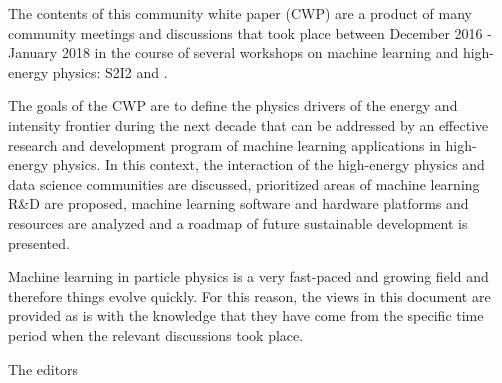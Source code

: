 The contents of this community white paper (CWP) are a product of many community meetings and discussions that took place between December 2016 - January 2018 in the course of several workshops on machine learning and high-energy physics: S2I2 and \cite{DSatHEP2017,IML2017,ACAT2017,HSF2017}.

The goals of the CWP are to define the physics drivers of the energy and intensity frontier during the next decade that can be addressed by an effective research and development program of machine learning applications in high-energy physics. In this context, the interaction of the high-energy physics and data science communities are discussed, prioritized areas of machine learning R\&D are proposed, machine learning software and hardware platforms and resources are analyzed and a roadmap of future sustainable development is presented.

Machine learning in particle physics is a very fast-paced and growing field and therefore things evolve quickly. For this reason, the views in this document are provided as is with the knowledge that they have come from the specific time period when the relevant discussions took place.

The editors
